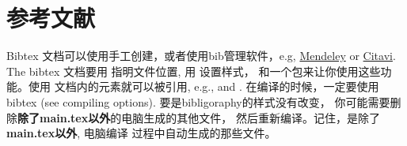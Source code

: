 
\section{参考文献}

Bibtex 文档可以使用手工创建，或者使用bib管理软件，e.g,  
\href{http://www.mendeley.com/}{Mendeley} or \href{http://citavi.com/en/index.html}{Citavi}. 
The bibtex 文档要用  指明文件位置, 用  设置样式，
和一个包来让你使用这些功能。使用  文档内的元素就可以被引用, e.g., \cite{Hill1952} and \citep{Kroner1977}. 
在编译的时候，一定要使用bibtex (see compiling options). 要是bibligoraphy的样式没有改变，
你可能需要删除\textbf{除了main.tex以外}的电脑生成的其他文件， 然后重新编译。记住，是除了\textbf{main.tex以外}, 电脑编译
过程中自动生成的那些文件。

